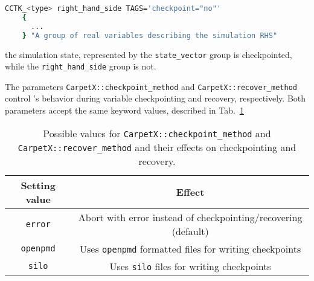 \begin{enumerate}
\begin{lstlisting}[language=bash]
    CCTK_<type> right_hand_side TAGS='checkpoint="no"'
    {
      ...
    } "A group of real variables describing the simulation RHS"
  \end{lstlisting}
  the simulation state, represented by the \texttt{state\_vector} group is checkpointed, while the \texttt{right\_hand\_side} group is not.
  
  The parameters \texttt{CarpetX::checkpoint\_method} and \texttt{CarpetX::recover\_method} control \CarpetX's behavior during variable checkpointing and recovery, respectively. Both parameters accept the same keyword values, described in Tab.~\ref{tab:checkpoint_recovery}

  \begin{table}[hb]
    \centering
    \begin{tabular}{cc}
    Setting value    & Effect                                                         \\ \hline\hline
    \texttt{error}   & Abort with error instead of checkpointing/recovering (default) \\
    \texttt{openpmd} & Uses \texttt{openpmd} formatted files for writing checkpoints  \\
    \texttt{silo}    & Uses \texttt{silo} files for writing checkpoints               \\ \hline\hline
    \end{tabular}
    \caption{Possible values for \texttt{CarpetX::checkpoint\_method} and \texttt{CarpetX::recover\_method} and their effects on checkpointing and recovery.}
    \label{tab:checkpoint_recovery}
    \end{table}
\end{enumerate}